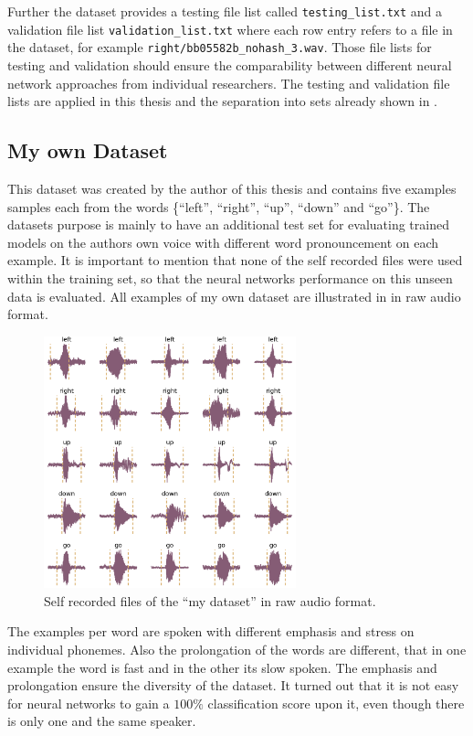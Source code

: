 Further the dataset provides a testing file list called \texttt{testing\_list.txt} and a validation file list \texttt{validation\_list.txt} where each row entry refers to a file in the dataset, for example \texttt{right/bb05582b\_nohash\_3.wav}.
Those file lists for testing and validation should ensure the comparability between different neural network approaches from individual researchers.
The testing and validation file lists are applied in this thesis and the separation into sets already shown in .



\subsection{My own Dataset}\label{sec:exp_dataset_my}
This dataset was created by the author of this thesis and contains five examples samples each from the words \{\enquote{left}, \enquote{right}, \enquote{up}, \enquote{down} and \enquote{go}\}.
The datasets purpose is mainly to have an additional test set for evaluating trained models on the authors own voice with different word pronouncement on each example.
It is important to mention that none of the self recorded files were used within the training set, so that the neural networks performance on this unseen data is evaluated.
All examples of my own dataset are illustrated in  in raw audio format.
\begin{figure}[!ht]
  \centering
    \includegraphics[width=0.65\textwidth]{./5_exp/figs/exp_dataset_wav_grid_my}
  \caption{Self recorded files of the \enquote{my dataset} in raw audio format.}
  \label{fig:exp_dataset_wav_grid_my}
\end{figure}
\FloatBarrier
\noindent
The examples per word are spoken with different emphasis and stress on individual phonemes.
Also the prolongation of the words are different, that in one example the word is fast and in the other its slow spoken.
The emphasis and prolongation ensure the diversity of the dataset. 
It turned out that it is not easy for neural networks to gain a $100\%$ classification score upon it, even though there is only one and the same speaker.


